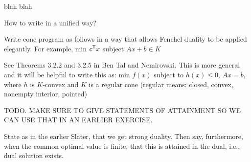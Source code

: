 blah blah


How to write in a unified way?

Write cone program as follows in a way that allows Fenchel duality to be applied
elegantly. For example, min $c^{\mathsf{T}} x$ subject $Ax + b \in K$

See Theorems 3.2.2 and 3.2.5 in Ben Tal and Nemirovski. This is more general and 
it will be helpful to write this as: min $f(x)$ subject to $h(x) \leq 0$, $Ax =
b$, where $h$ is $K$-convex and $K$ is a regular cone (regular means: closed,
convex, nonempty interior, pointed)


\begin{Theorem}
\label{thm:slater_conic}
TODO. MAKE SURE TO GIVE STATEMENTS OF ATTAINMENT SO WE CAN USE THAT IN AN
EARLIER EXERCISE.    

State as in the earlier Slater, that we get strong duality. Then say,
furthermore, when the common optimal value is finite, that this is attained in 
the dual, i.e., dual solution exists. 




\end{Theorem}

